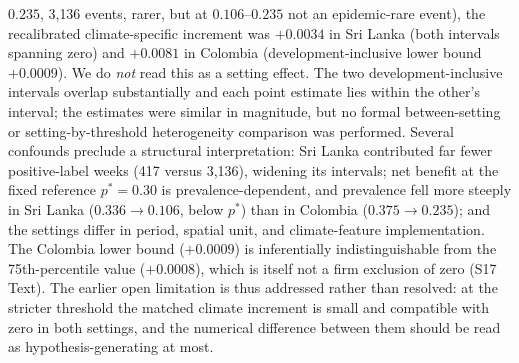 \documentclass[11pt,a4paper]{article}
\begin{document}
$0.235$, 3{,}136 events, rarer, but at $0.106$--$0.235$ not an epidemic-rare event), the recalibrated
climate-specific increment was $+0.0034$ in Sri Lanka (both intervals spanning zero) and $+0.0081$ in
Colombia (development-inclusive lower bound $+0.0009$). We do \emph{not} read this as a setting effect.
The two development-inclusive intervals overlap substantially and each point estimate lies within the
other's interval; the estimates were similar in magnitude, but no formal between-setting or
setting-by-threshold heterogeneity comparison was performed. Several confounds preclude a structural
interpretation: Sri Lanka contributed far fewer positive-label weeks (417 versus 3{,}136), widening
its intervals; net benefit at the fixed reference $p^*=0.30$ is prevalence-dependent, and prevalence
fell more steeply in Sri Lanka ($0.336\to0.106$, below $p^*$) than in Colombia ($0.375\to0.235$); and
the settings differ in period, spatial unit, and climate-feature implementation. The Colombia lower
bound ($+0.0009$) is inferentially indistinguishable from the 75th-percentile value ($+0.0008$), which
is itself not a firm exclusion of zero (S17 Text). The earlier open limitation is thus addressed rather
than resolved: at the stricter threshold the matched climate increment is small and compatible with
zero in both settings, and the numerical difference between them should be read as hypothesis-generating
at most.
\end{document}
